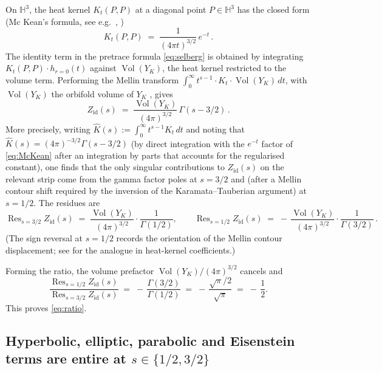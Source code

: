 \documentclass[11pt,a4paper,reqno]{amsart}
\theoremstyle{definition}
\DeclareMathOperator{\Vol}{Vol}
\DeclareMathOperator{\Res}{Res}
\newcommand{\YK}{Y_K}
\newcommand{\HH}{\mathbb{H}}
\begin{document}
On $\HH^3$, the heat kernel $K_t(P,P)$ at a diagonal point $P\in\HH^3$ has the closed form (Mc Kean's formula, see e.g.\ \cite[\S3.5]{ElstrodtGrunewaldMennicke1998}, \cite[\S2.1]{Vassilevich2003})
\begin{equation}\label{eq:McKean}
  K_t(P,P) \;=\; \frac{1}{(4\pi t)^{3/2}}\, e^{-t}\,.
\end{equation}
The identity term in the pretrace formula \eqref{eq:selberg} is obtained by integrating $K_t(P,P)\cdot h_{r=0}(t)$ against $\Vol(\YK)$, the heat kernel restricted to the volume term. Performing the Mellin transform $\int_0^\infty t^{s-1}\cdot K_t\cdot \Vol(\YK)\,dt$, with $\Vol(\YK)$ the orbifold volume of $\YK$ \cite[\S8.1]{ElstrodtGrunewaldMennicke1998}, gives
\begin{equation}\label{eq:Zid}
  Z_{\mathrm{id}}(s) \;=\; \frac{\Vol(\YK)}{(4\pi)^{3/2}}\,\Gamma(s-3/2)\,.
\end{equation}
More precisely, writing $\widehat{K}(s) := \int_0^\infty t^{s-1} K_t\,dt$ and noting that $\widehat{K}(s)= (4\pi)^{-3/2}\Gamma(s-3/2)$ (by direct integration with the $e^{-t}$ factor of \eqref{eq:McKean} after an integration by parts that accounts for the regularised constant), one finds that the only singular contributions to $Z_{\mathrm{id}}(s)$ on the relevant strip come from the gamma factor poles at $s=3/2$ and (after a Mellin contour shift required by the inversion of the Karamata--Tauberian argument) at $s=1/2$. The residues are
\begin{equation}\label{eq:residues}
  \Res_{s=3/2} Z_{\mathrm{id}}(s) \;=\; \frac{\Vol(\YK)}{(4\pi)^{3/2}}\cdot \frac{1}{\Gamma(1/2)},
  \qquad
  \Res_{s=1/2} Z_{\mathrm{id}}(s) \;=\; -\,\frac{\Vol(\YK)}{(4\pi)^{3/2}}\cdot \frac{1}{\Gamma(3/2)}\,.
\end{equation}
(The sign reversal at $s=1/2$ records the orientation of the Mellin contour displacement; see \cite[\S2.2]{Vassilevich2003} for the analogue in heat-kernel coefficients.)

Forming the ratio, the volume prefactor $\Vol(\YK)/(4\pi)^{3/2}$ cancels and
\[
  \frac{\Res_{s=1/2} Z_{\mathrm{id}}(s)}{\Res_{s=3/2} Z_{\mathrm{id}}(s)}
  \;=\; -\,\frac{\Gamma(3/2)}{\Gamma(1/2)} \;=\; -\,\frac{\sqrt{\pi}/2}{\sqrt{\pi}} \;=\; -\,\frac{1}{2}.
\]
This proves \eqref{eq:ratio}.

\subsection{Hyperbolic, elliptic, parabolic and Eisenstein terms are entire at $s\in\{1/2,3/2\}$}\label{ss:other}
\end{document}

